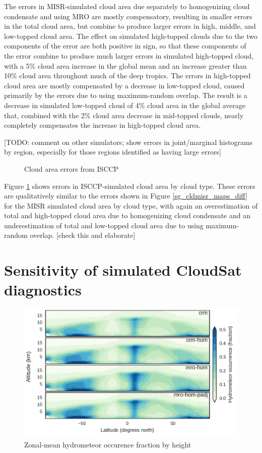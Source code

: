 The errors in MISR-simulated cloud area due separately to homogenizing cloud condensate and using MRO are mostly compensatory, resulting in smaller errors in the total cloud area, but combine to produce larger errors in high, middle, and low-topped cloud area. The effect on simulated high-topped clouds due to the two components of the error are both positive in sign, so that these components of the error combine to produce much larger errors in simulated high-topped cloud, with a 5\% cloud area increase in the global mean and an increase greater than 10\% cloud area throughout much of the deep tropics. The errors in high-topped cloud area are mostly compensated by a decrease in low-topped cloud, caused primarily by the errors due to using maximum-random overlap. The result is a decrease in simulated low-topped cloud of 4\% cloud area in the global average that, combined with the 2\% cloud area decrease in mid-topped clouds, nearly completely compensates the increase in high-topped cloud area. 

[TODO: comment on other simulators; show errors in joint/marginal histograms by region, especially for those regions identified as having large errors]
\begin{figure}
\centering
\caption{Cloud area errors from ISCCP}
\label{sg_cldisccp_errors}
\end{figure}

Figure \ref{sg_cldisccp_errors} shows errors in ISCCP-simulated cloud area by cloud type. These errors are qualitatively similar to the errors shown in Figure \ref{sg_cldmisr_maps_diff} for the MISR simulated cloud area by cloud type, with again an overestimation of total and high-topped cloud area due to homogenizing cloud condensate and an underestimation of total and low-topped cloud area due to using maximum-random overlap. [check this and elaborate]

\section{Sensitivity of simulated CloudSat diagnostics}

\begin{figure}
\centering
\includegraphics[width=\columnwidth]{graphics/subgrid1_hfba_zonal.pdf}
\caption{Zonal-mean hydrometeor occurence fraction by height}
\label{sg_hfba_zonal}
\end{figure}

